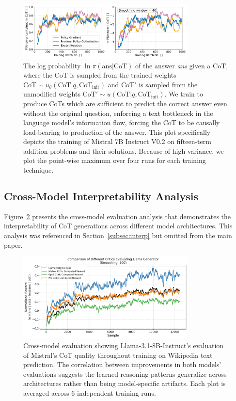 \documentclass{article}
\begin{document}
\begin{figure}[ht]
    \centering
    \includegraphics[width=0.8\textwidth]{Figures/cot_performance_comparison.png}
    \caption{The log probability $\ln \pi(\text{ans} | \text{CoT})$ of the answer \textit{ans} given a CoT, where the CoT is sampled from the trained weights $\text{CoT} \sim u_\theta(\text{CoT} | q, \text{CoT}_{\text{init}})$ and $\text{CoT}'$ is sampled from the unmodified weights $\text{CoT}' \sim u(\text{CoT} | q, \text{CoT}_{\text{init}})$. We train to produce CoTs which are sufficient to predict the correct answer even without the original question, enforcing a text bottleneck in the language model's information flow, forcing the CoT to be causally load-bearing to production of the answer. This plot specifically depicts the training of Mistral 7B Instruct V0.2 on fifteen-term addition problems and their solutions. Because of high variance, we plot the point-wise maximum over four runs for each training technique.}
    \label{fig:cot_arithmetic_performance}
\end{figure}

\subsection{Cross-Model Interpretability Analysis}
Figure~\ref{fig:wiki_cross_model} presents the cross-model evaluation analysis that demonstrates the interpretability of CoT generations across different model architectures. This analysis was referenced in Section~\ref{subsec:interp} but omitted from the main paper.

\begin{figure}[ht]
    \centering
    \includegraphics[width=0.8\textwidth]{Figures/wiki_multi_critic_comparison.png}
    \caption{Cross-model evaluation showing Llama-3.1-8B-Instruct's evaluation of Mistral's CoT quality throughout training on Wikipedia text prediction. The correlation between improvements in both models' evaluations suggests the learned reasoning patterns generalize across architectures rather than being model-specific artifacts. Each plot is averaged across 6 independent training runs.}
    \label{fig:wiki_cross_model}
\end{figure}
\end{document}
